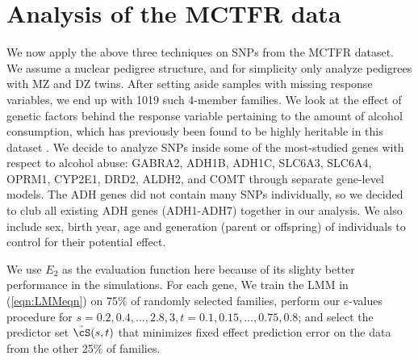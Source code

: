 \section{Analysis of the MCTFR data}
\label{sec:DataSection}

We now apply the above three techniques on SNPs from the MCTFR dataset. We assume a nuclear pedigree structure, and for simplicity only analyze pedigrees with MZ and DZ twins. After setting aside samples with missing response variables, we end up with 1019 such 4-member families. We look at the effect of genetic factors behind the response variable pertaining to the amount of alcohol consumption, which has previously been found to be highly heritable in this dataset \citep{McGueEtal13}. We decide to analyze SNPs inside some of the most-studied genes with respect to alcohol abuse: GABRA2, ADH1B, ADH1C, SLC6A3, SLC6A4, OPRM1, CYP2E1, DRD2, ALDH2, and COMT \citep{CoombesThesis16} through separate gene-level models. The ADH genes did not contain many SNPs individually, so we decided to club all existing ADH genes (ADH1-ADH7) together in our analysis. We also include sex, birth year, age and generation (parent or offspring) of individuals to control for their potential effect.

We use $E_2$ as the evaluation function here because of its slighty better performance in the simulations. For each gene, We train the LMM in (\ref{eqn:LMMeqn}) on 75\% of randomly selected families, perform our $e$-values procedure for $s = 0.2, 0.4, \ldots, 2.8, 3, t = 0.1, 0.15, \ldots, 0.75, 0.8$; and select the predictor set $\hat \cS (s,t) $ that minimizes fixed effect prediction error on the data from the other 25\% of families.  

